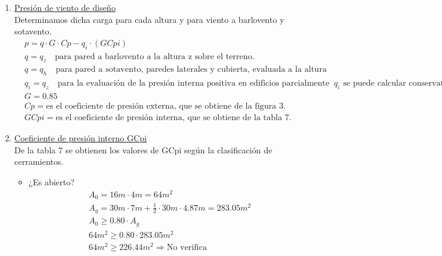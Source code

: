 \begin{enumerate}
\item \underline{Presión de viento de diseño}\\
Determinamos dicha carga para cada altura y para viento a barlovento y sotavento.
\begin{align*}
& p = q \cdot G \cdot Cp - q_i \cdot (GCpi) \\
& q = q_z \quad\text{para pared a barlovento a la altura z sobre el terreno.}\\
& q = q_h \quad\text{para pared a sotavento, paredes laterales y cubierta, evaluada a la altura media de cubierta, h.}\\
& q_i = q_z \quad\text{para la evaluación de la presión interna positiva en edificios parcialmente cerrados, donde la altura z está definida como el nivel de la abertura más elevada del edificio que puede afectar la presión interna positiva. Para la evaluación de la presión interna positiva, $q_i$ se puede calcular conservativamente la altura h ($q_i=q_h$)}\\
& G = 0.85 \\
& Cp = \text{es el coeficiente de presión externa, que se obtiene de la figura 3.} \\
& GCpi = \text{es el coeficiente de presión interna, que se obtiene de la tabla 7.}
\end{align*}

\item \underline{Coeficiente de presión interno GCpi}\\
De la tabla 7 se obtienen los valores de GCpi según la clasificación de cerramientos.

\begin{itemize}
\item ¿Es abierto?
\begin{align*}
& A_0 = 16m \cdot 4m = 64 m^2 \\
& A_g = 30m \cdot 7m + \frac{1}{2} \cdot 30m \cdot 4.87m = 283.05 m^2 \\
& A_0 \geq 0.80 \cdot A_g \\
& 64 m^2 \geq 0.80 \cdot 283.05 m^2 \\
& 64 m^2 \geq 226.44 m^2 \Rightarrow \text{No verifica}
\end{align*}


\end{itemize}
\end{enumerate}
